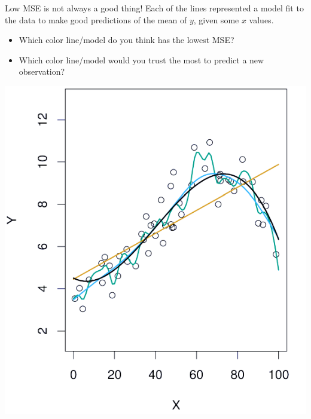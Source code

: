 \documentclass[table]{beamer}\usepackage[]{graphicx}\usepackage[]{color}
\begin{document}
\begin{frame}{Low MSE is not always a good thing!}
Each of the lines represented a model fit to the data to make good predictions of the mean of $y$, given some $x$ values.
\begin{itemize}
  \item Which color line/model do you think has the lowest MSE?
  \item Which color line/model would you trust the most to predict a new observation?
\end{itemize}

\centerline{
\includegraphics[scale=.6,angle=0]{figure-static/2_9-half.pdf}
}


\end{frame}

\end{document}
